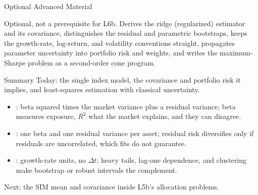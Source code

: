 \documentclass[aspectratio=169,11pt]{beamer}
\begin{document}
\begin{frame}{Optional Advanced Material}
  \vspace{0.4em}
  {\normalsize\textbf{} \par
  }

  \vspace{0.7em}
  Optional, not a prerequisite for L6b. Derives the ridge (regularized)
  estimator and its covariance, distinguishes the residual and parametric
  bootstraps, keeps the growth-rate, log-return, and volatility conventions
  straight, propagates parameter uncertainty into portfolio risk and weights,
  and writes the maximum-Sharpe problem as a second-order cone program.
\end{frame}

\begin{frame}{Summary}
  Today: the single index model, the covariance and portfolio risk it implies,
  and least-squares estimation with classical uncertainty.

  \vspace{0.2em}
  {\large\textbf{}}
  \vspace{0.1em}
  \begin{itemize}\setlength{\itemsep}{0.3em}
    \item {}: beta squared times the market
      variance plus a residual variance; beta measures exposure, $R^2$ what the
      market explains, and they can disagree.
    \item {}: one beta and one residual variance per asset; residual risk
      diversifies only if residuals are uncorrelated, which fits do not
      guarantee.
    \item {}: growth-rate
      units, no $\Delta t$; heavy tails, lag-one dependence, and clustering make
      bootstrap or robust intervals the complement.
  \end{itemize}

  \vspace{0.1em}
  Next: the SIM mean and covariance inside L5b's allocation problems.
\end{frame}

\end{document}
